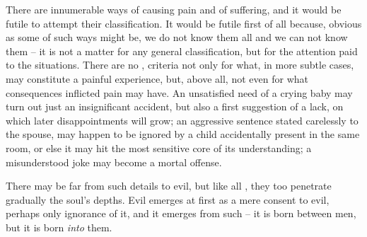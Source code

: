 There are innumerable ways of causing pain and of suffering, and it would be
futile to attempt 
their classification. It would be futile first of all because, obvious as some
of such ways might be, we do not know them all
and we can not know them -- it is not a matter for any general classification, but
for the  attention paid to the  situations. There are no
,  criteria not only for what, in more subtle cases,
may constitute a {painful} experience, but, above all, not even for what
consequences inflicted {pain} may have.  An unsatisfied need of a crying baby
may turn out just an insignificant accident, but also a first suggestion of a
lack, on which later disappointments will grow; an aggressive sentence stated
carelessly to the spouse, may happen to be ignored by a child accidentally
present in the same room, or else it may hit the most sensitive core of its
understanding; a misunderstood joke may become a mortal offense.

There may be far from such details to evil, but like all , they too penetrate gradually the soul's  depths.
Evil emerges at first as a mere consent to evil, perhaps only ignorance of it,
and it emerges from such  -- it is born between men, but
it is born {\em into} them. 




